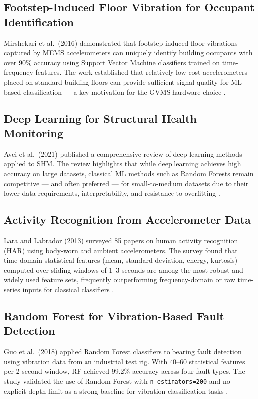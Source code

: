 \documentclass[12pt,a4paper]{report}
\begin{document}
\subsection{Footstep-Induced Floor Vibration for Occupant Identification}
Mirshekari et al.\ (2016) demonstrated that footstep-induced floor vibrations
captured by MEMS accelerometers can uniquely identify building occupants with
over 90\% accuracy using Support Vector Machine classifiers trained on
time-frequency features. The work established that relatively low-cost
accelerometers placed on standard building floors can provide sufficient signal
quality for ML-based classification --- a key motivation for the GVMS hardware
choice \cite{mirshekari2016}.

\subsection{Deep Learning for Structural Health Monitoring}
Avci et al.\ (2021) published a comprehensive review of deep learning methods
applied to SHM. The review highlights that while deep learning achieves high
accuracy on large datasets, classical ML methods such as Random Forests remain
competitive --- and often preferred --- for small-to-medium datasets due to
their lower data requirements, interpretability, and resistance to overfitting
\cite{avci2021}.

\subsection{Activity Recognition from Accelerometer Data}
Lara and Labrador (2013) surveyed 85 papers on human activity recognition
(HAR) using body-worn and ambient accelerometers. The survey found that
time-domain statistical features (mean, standard deviation, energy, kurtosis)
computed over sliding windows of 1--3 seconds are among the most robust and
widely used feature sets, frequently outperforming frequency-domain or raw
time-series inputs for classical classifiers \cite{lara2013}.

\subsection{Random Forest for Vibration-Based Fault Detection}
Guo et al.\ (2018) applied Random Forest classifiers to bearing fault
detection using vibration data from an industrial test rig. With 40--60
statistical features per 2-second window, RF achieved 99.2\% accuracy across
four fault types. The study validated the use of Random Forest with
\texttt{n\_estimators=200} and no explicit depth limit as a strong baseline
for vibration classification tasks \cite{guo2018}.
\end{document}
